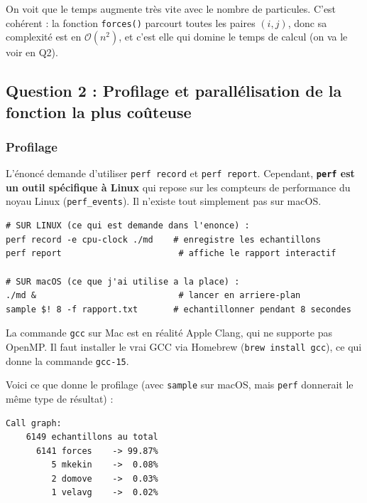 \documentclass[12pt,a4paper]{article}
\begin{document}
On voit que le temps augmente très vite avec le nombre de particules. C'est cohérent : la fonction \texttt{forces()} parcourt toutes les paires $(i, j)$, donc sa complexité est en $\mathcal{O}(n^2)$, et c'est elle qui domine le temps de calcul (on va le voir en Q2).


\subsection{Question 2 : Profilage et parallélisation de la fonction la plus coûteuse}

\subsubsection{Profilage}

L'énoncé demande d'utiliser \texttt{perf record} et \texttt{perf report}. Cependant, \textbf{\texttt{perf} est un outil spécifique à Linux} qui repose sur les compteurs de performance du noyau Linux (\texttt{perf\_events}). Il n'existe tout simplement pas sur macOS.

\begin{lstlisting}[style=bashstyle, title={\color{mainblue} Profilage : Linux vs macOS}]
# SUR LINUX (ce qui est demande dans l'enonce) :
perf record -e cpu-clock ./md    # enregistre les echantillons
perf report                       # affiche le rapport interactif

# SUR macOS (ce que j'ai utilise a la place) :
./md &                            # lancer en arriere-plan
sample $! 8 -f rapport.txt       # echantillonner pendant 8 secondes
\end{lstlisting}

\begin{infobox}
La commande \texttt{gcc} sur Mac est en réalité Apple Clang, qui ne supporte pas OpenMP. Il faut installer le vrai GCC via Homebrew (\texttt{brew install gcc}), ce qui donne la commande \texttt{gcc-15}.
\end{infobox}

Voici ce que donne le profilage (avec \texttt{sample} sur macOS, mais \texttt{perf} donnerait le même type de résultat) :

\begin{resultbox}
\begin{lstlisting}[style=outputstyle, frame=none, backgroundcolor=\color{resultgreen}]
Call graph:
    6149 echantillons au total
      6141 forces    -> 99.87%
         5 mkekin    ->  0.08%
         2 domove    ->  0.03%
         1 velavg    ->  0.02%
\end{lstlisting}
\end{resultbox}
\end{document}
